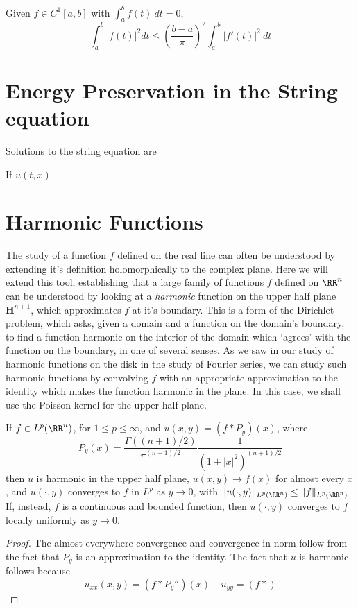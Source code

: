 \begin{corollary}
    Given $f \in C^1[a,b]$ with $\int_a^b f(t)\ dt = 0$,
    \[ \int_a^b |f(t)|^2 dt \leq \left(\frac{b-a}{\pi}\right)^2 \int_a^b |f'(t)|^2\ dt \]
\end{corollary}

\section{Energy Preservation in the String equation}

Solutions to the string equation are

If $u(t,x)$

\section{Harmonic Functions} 

The study of a function $f$ defined on the real line can often be understood by extending it's definition holomorphically to the complex plane. Here we will extend this tool, establishing that a large family of functions $f$ defined on $\RR^n$ can be understood by looking at a {\it harmonic} function on the upper half plane $\mathbf{H}^{n+1}$, which approximates $f$ at it's boundary. This is a form of the Dirichlet problem, which asks, given a domain and a function on the domain's boundary, to find a function harmonic on the interior of the domain which `agrees' with the function on the boundary, in one of several senses. As we saw in our study of harmonic functions on the disk in the study of Fourier series, we can study such harmonic functions by convolving $f$ with an appropriate approximation to the identity which makes the function harmonic in the plane. In this case, we shall use the Poisson kernel for the upper half plane.

\begin{theorem}
    If $f \in L^p(\RR^n)$, for $1 \leq p \leq \infty$, and $u(x,y) = (f * P_y)(x)$, where
    \[ P_y(x) = \frac{\Gamma((n+1)/2)}{\pi^{(n+1)/2}} \frac{1}{(1 + |x|^2)^{(n+1)/2}} \]
    then $u$ is harmonic in the upper half plane, $u(x,y) \to f(x)$ for almost every $x$, and $u(\cdot,y)$ converges to $f$ in $L^p$ as $y \to 0$, with $\| u(\cdot,y) \|_{L^p(\RR^n)} \leq \| f \|_{L^p(\RR^n)}$. If, instead, $f$ is a continuous and bounded function, then $u(\cdot,y)$ converges to $f$ locally uniformly as $y \to 0$.
\end{theorem}
\begin{proof}
    The almost everywhere convergence and convergence in norm follow from the fact that $P_y$ is an approximation to the identity. The fact that $u$ is harmonic follows because
    \[ u_{xx}(x,y) = (f * P_y'')(x)\ \ \ \ \ u_{yy} = (f * ) \]
\end{proof}









